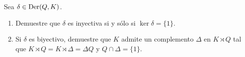 \begin{exercise}
	\label{xca:ker1cocycle}
	Sea $\delta\in\operatorname{Der}(Q,K)$. 
	\begin{enumerate}
	\item Demuestre que $\delta$ es inyectiva si y sólo si
	$\ker\delta=\{1\}$.
	\item Si $\delta$ es biyectivo, demuestre que 
	$K$ admite un complemento
	$\Delta$ en $K\rtimes Q$ tal que $K\rtimes Q=K\rtimes\Delta=\Delta Q$ y
	$Q\cap\Delta=\{1\}$.
	\end{enumerate}
\end{exercise}




